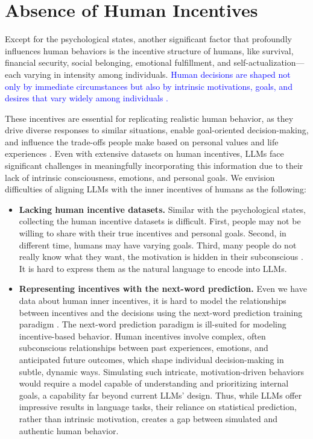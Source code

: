 \section{Absence of Human Incentives}
Except for the psychological states, another significant factor that profoundly influences human behaviors is the incentive structure of humans, like survival, financial security, social belonging, emotional fulfillment, and self-actualization—each varying in intensity among individuals. \textcolor{blue}{Human decisions are shaped not only by immediate circumstances but also by intrinsic motivations, goals, and desires that vary widely among individuals \citep{maslow2023motivation}.}

These incentives are essential for replicating realistic human behavior, as they drive diverse responses to similar situations, enable goal-oriented decision-making, and influence the trade-offs people make based on personal values and life experiences \citep{shen2024motivation}. Even with extensive datasets on human incentives, LLMs face significant challenges in meaningfully incorporating this information due to their lack of intrinsic consciousness, emotions, and personal goals. We envision difficulties of aligning LLMs with the inner incentives of humans as the following:

\begin{itemize}
\item \textbf{Lacking human incentive datasets.} Similar with the psychological states, collecting the human incentive datasets is difficult. First, people may not be willing to share with their true incentives and personal goals. Second, in different time, humans may have varying goals. Third, many people do not really know what they want, the motivation is hidden in their subconscious \citep{maslow2023motivation}. It is hard to express them as the natural language to encode into LLMs.

\item \textbf{Representing incentives with the next-word prediction.} Even we have data about human inner incentives, it is hard to model the relationships between incentives and the decisions using the next-word prediction training paradigm \citep{kou2023risks, wang2024research}. The next-word prediction paradigm is ill-suited for modeling incentive-based behavior. Human incentives involve complex, often subconscious relationships between past experiences, emotions, and anticipated future outcomes, which shape individual decision-making in subtle, dynamic ways. Simulating such intricate, motivation-driven behaviors would require a model capable of understanding and prioritizing internal goals, a capability far beyond current LLMs’ design. Thus, while LLMs offer impressive results in language tasks, their reliance on statistical prediction, rather than intrinsic motivation, creates a gap between simulated and authentic human behavior.
\end{itemize}


